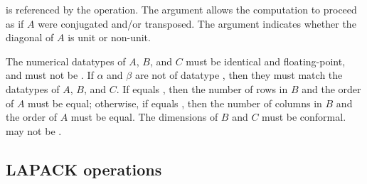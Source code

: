 \begin{flaspec}
{is referenced by the operation.
The \trans argument allows the computation to proceed as if $ A $ were
conjugated and/or transposed.
The \diag argument indicates whether the diagonal of $ A $ is unit or
non-unit.
}
\begin{checks}
\checkitem
The numerical datatypes of $ A $, $ B $, and $ C $ must be identical and
floating-point, and must not be \flaconstantns.
\itemvsp
\checkitem
If $ \alpha $ and $ \beta $ are not of datatype \flaconstantns, then they must
match the datatypes of $ A $, $ B $, and $ C $.
\itemvsp
\checkitem
If \side equals \flaleftns, then the number of rows in $ B $ and the order of
$ A $ must be equal; otherwise, if \side equals \flarightns, then the number
of columns in $ B $ and the order of $ A $ must be equal.
\itemvsp
\checkitem
The dimensions of $ B $ and $ C $ must be conformal.
\itemvsp
\checkitem
\diag may not be \flazerodiagns.
\end{checks}
\begin{params}
\end{params}
\end{flaspec}

















\subsection{LAPACK operations}


